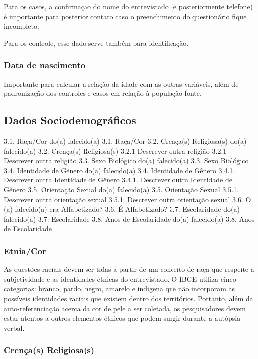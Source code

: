 Para os casos, a confirmação do nome do entrevistado (e posteriormente telefone) é importante para posterior contato caso o preenchimento do questionário fique incompleto.

Para os controle, esse dado serve também para identificação.


\subsubsection{Data de nascimento}

Importante para calcular a relação da idade com as outras variáveis, além de padronização dos controles e casos em relação à população fonte.



\subsection{Dados Sociodemográficos}

3.1. Raça/Cor do(a) falecido(a)	3.1. Raça/Cor
3.2. Crença(s) Religiosa(s) do(a) falecido(a)	3.2. Crença(s) Religiosa(s)
3.2.1 Descrever outra religião	3.2.1 Descrever outra religião
3.3. Sexo Biológico do(a) falecido(a)	3.3. Sexo Biológico
3.4. Identidade de Gênero do(a) falecido(a)	3.4. Identidade de Gênero
3.4.1. Descrever outra Identidade de Gênero	3.4.1. Descrever outra Identidade de Gênero
3.5. Orientação Sexual do(a) falecido(a)	3.5. Orientação Sexual
3.5.1. Descrever outra orientação sexual	3.5.1. Descrever outra orientação sexual
3.6. O (a) falecido(a) era Alfabetizado?	3.6. É Alfabetizado?
3.7. Escolaridade do(a) falecido(a)	3.7. Escolaridade
3.8. Anos de Escolaridade do(a) falecido(a)	3.8. Anos de Escolaridade


\subsubsection{Etnia/Cor}


As questões raciais devem ser tidas a partir de um conceito de raça que respeite a subjetividade e as identidades étnicas do entrevistado. O IBGE utiliza cinco categorias: branco, pardo, negro, amarelo e indigena que não incorporam as possíveis identidades raciais que existem dentro dos territórios. Portanto, além da auto-referenciação acerca da cor de pele a ser coletada, os pesquisadores devem estar atentos a outros elementos étnicos que podem surgir durante a autópsia verbal. 


\subsubsection{Crença(s) Religiosa(s)}

